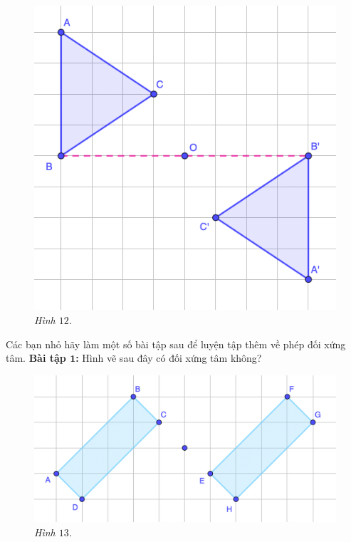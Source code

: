 \begin{multicols}{2}
\begin{figure}[H]
		\includegraphics[width= 1\linewidth]{12}
		\caption{\small\textit{\color{toancuabi}Hình $12$.}}
		\vspace*{-10pt}
	\end{figure}
	Các bạn nhỏ hãy làm một số bài tập sau để luyện tập thêm về phép đối xứng tâm.
	\vskip 0.1cm
	\textbf{\color{toancuabi}Bài tập $\pmb1$:} Hình vẽ sau đây có đối xứng tâm không?
	\begin{figure}[H]
		\vspace*{-5pt}
		\centering
		\captionsetup{labelformat= empty, justification=centering}
		\includegraphics[width= 1\linewidth]{13}
		\caption{\small\textit{\color{toancuabi}Hình $13$.}}
		\vspace*{-10pt}
	\end{figure}

\end{multicols}
